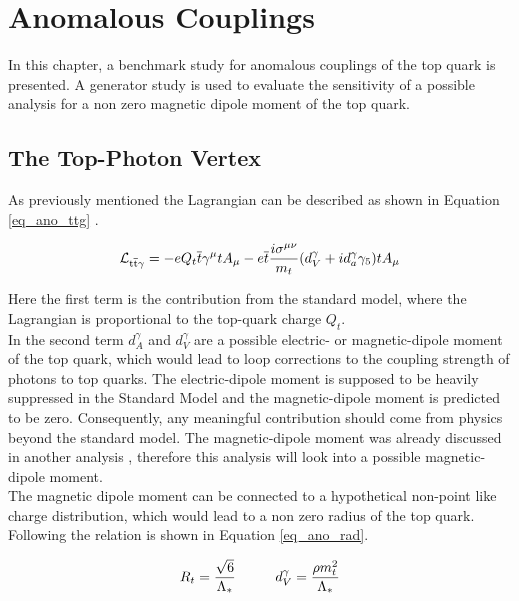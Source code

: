 \chapter{Anomalous Couplings}

In this chapter, a benchmark study for anomalous couplings of the top quark is presented. A generator study is used to evaluate the sensitivity of a possible \ttgamma analysis for a non zero magnetic dipole moment of the top quark.
\section{The Top-Photon Vertex}

As previously mentioned  the \ttgamma Lagrangian can be described as shown in  Equation \ref{eq_ano_ttg} \cite{AguilarSaavedra:2008zc}.

\begin{equation}
  \mathcal{L}_{\mathrm{t}\overline{\mathrm{t}} \gamma} = -e Q_t \overline{t} \gamma^{\mu} t A_{\mu} - e \overline{t} \frac{i \sigma^{\mu \nu}}{m_t} (d_V^{\gamma} + i d_a^{\gamma} \gamma_5) t A_{\mu}
  \label{eq_ano_ttg}
  \end{equation}

Here the first term is the contribution from the standard model, where the Lagrangian is proportional to the top-quark charge $Q_t$.\\
In the second term $d_A^{\gamma}$ and $d_V^{\gamma}$ are a possible electric- or  magnetic-dipole moment of the top quark, which would lead to loop corrections to the coupling strength of photons to top quarks. The electric-dipole moment is supposed to be heavily suppressed in the Standard Model \cite{Jersak:1981sp} and the magnetic-dipole moment is predicted to be zero. Consequently, any meaningful contribution should come from physics beyond the standard model. The magnetic-dipole moment was already discussed in another analysis , therefore this analysis will look into a possible magnetic-dipole moment.\\
The  magnetic dipole moment can be connected to a hypothetical non-point like charge distribution, which would lead to a non zero radius of the top quark. Following \cite{Englert:2012by} \cite{Kopp:1994qv} the relation is shown in Equation \ref{eq_ano_rad}.

\begin{equation}
R_t = \frac{\sqrt{6}}{\Lambda_{\ast}} \hspace{1.cm} d_V^{\gamma} = \frac{\rho m_t^2}{\Lambda_{\ast}}
\label{eq_ano_rad}
\end{equation}

